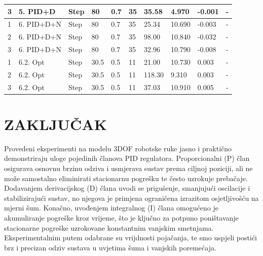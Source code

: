 \documentclass[12pt,a4paper]{article}
\begin{document}
\begin{table}[!ht]
{\begin{tabular}{|l|l|l|l|l|l|l|l|l|l|}
3     & 5. PID+D& Step & 80 & 0.7 & 35 & 35.58         & 4.970             & -0.001         & -          \\ \hline
1     & 6. PID+D+N& Step & 80 & 0.7 & 35 & 25.34         & 10.690            & -0.003         & -          \\ \hline
2     & 6. PID+D+N& Step & 80 & 0.7 & 35 & 98.00         & 10.840            & -0.032         & -          \\ \hline
3     & 6. PID+D+N& Step & 80 & 0.7 & 35 & 32.96         & 10.790            & -0.008         & -          \\ \hline
1     & 6.2. Opt & Step & 30.5 & 0.5 & 11 & 21.00         & 10.730            & 0.003          & -          \\ \hline
2     & 6.2. Opt & Step & 30.5 & 0.5 & 11 & 118.30        & 9.310             & 0.003          & -          \\ \hline
3     & 6.2. Opt & Step & 30.5 & 0.5 & 11 & 37.03         & 10.910            & 0.005          & -          \\ \hline
\end{tabular}
}
\end{table}

\section{ZAKLJUČAK}
Provedeni eksperimenti na modelu 3DOF robotske ruke jasno i praktično demonstriraju uloge pojedinih članova PID regulatora. Proporcionalni (P) član osigurava osnovnu brzinu odziva i usmjerava sustav prema ciljnoj poziciji, ali ne može samostalno eliminirati stacionarnu pogrešku te često uzrokuje prebačaje. Dodavanjem derivacijskog (D) člana uvodi se prigušenje, smanjujući oscilacije i stabilizirajući sustav, no njegova je primjena ograničena izrazitom osjetljivošću na mjerni šum. Konačno, uvođenjem integralnog (I) člana omogućeno je akumuliranje pogreške kroz vrijeme, što je ključno za potpuno poništavanje stacionarne pogreške uzrokovane konstantnim vanjskim smetnjama. Eksperimentalnim putem odabrane su vrijdnosti pojačanja, te smo uspjeli postići brz i precizan odziv sustava u uvjetima šuma i vanjskih poremećaja.
\end{document}
